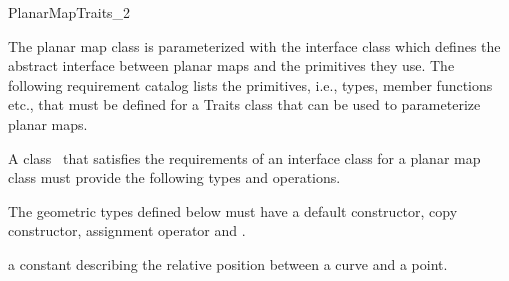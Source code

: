 
\ccRefPageBegin


\begin{ccRefConcept}{PlanarMapTraits_2}
\label{PM_sec:req:interface} 
 

The planar map class is parameterized with the
interface class  which defines the abstract interface
between planar maps and the primitives they use. 
The following
requirement catalog lists the primitives, i.e., types, member functions
etc., that must be defined for a Traits class that can be used to
parameterize planar maps. %



\ccDefinition
    A class \ccClassTemplateName\ that satisfies the requirements of an
    interface class for a planar map class must provide the
    following types and operations. 

\ccTypes

    The geometric types defined below must have a default constructor,
    copy constructor, assignment operator and .
    
  
     {a constant describing the relative position between
       a curve and a point.}


    

\end{ccRefConcept}
